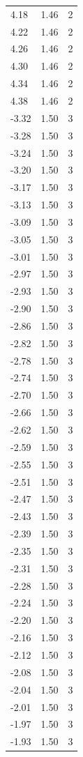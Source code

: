 \begin{longtable}{lrr}
  4.18 & 1.46 & 2 \\
  4.22 & 1.46 & 2 \\
  4.26 & 1.46 & 2 \\
  4.30 & 1.46 & 2 \\
  4.34 & 1.46 & 2 \\
  4.38 & 1.46 & 2 \\
  -3.32 & 1.50 & 3 \\
  -3.28 & 1.50 & 3 \\
  -3.24 & 1.50 & 3 \\
  -3.20 & 1.50 & 3 \\
  -3.17 & 1.50 & 3 \\
  -3.13 & 1.50 & 3 \\
  -3.09 & 1.50 & 3 \\
  -3.05 & 1.50 & 3 \\
  -3.01 & 1.50 & 3 \\
  -2.97 & 1.50 & 3 \\
  -2.93 & 1.50 & 3 \\
  -2.90 & 1.50 & 3 \\
  -2.86 & 1.50 & 3 \\
  -2.82 & 1.50 & 3 \\
  -2.78 & 1.50 & 3 \\
  -2.74 & 1.50 & 3 \\
  -2.70 & 1.50 & 3 \\
  -2.66 & 1.50 & 3 \\
  -2.62 & 1.50 & 3 \\
  -2.59 & 1.50 & 3 \\
  -2.55 & 1.50 & 3 \\
  -2.51 & 1.50 & 3 \\
  -2.47 & 1.50 & 3 \\
  -2.43 & 1.50 & 3 \\
  -2.39 & 1.50 & 3 \\
  -2.35 & 1.50 & 3 \\
  -2.31 & 1.50 & 3 \\
  -2.28 & 1.50 & 3 \\
  -2.24 & 1.50 & 3 \\
  -2.20 & 1.50 & 3 \\
  -2.16 & 1.50 & 3 \\
  -2.12 & 1.50 & 3 \\
  -2.08 & 1.50 & 3 \\
  -2.04 & 1.50 & 3 \\
  -2.01 & 1.50 & 3 \\
  -1.97 & 1.50 & 3 \\
  -1.93 & 1.50 & 3 \\

\end{longtable}
